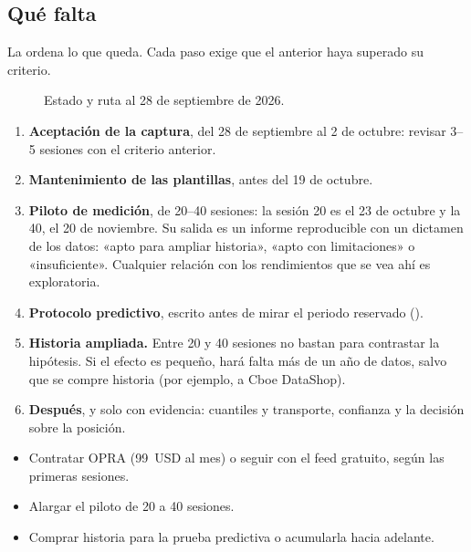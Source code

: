 \subsection{Qué falta}\label{sec:estado_falta}

La  ordena lo que queda. Cada paso exige que el anterior haya superado su criterio.

\begin{figure}[H]
\centering
\resizebox{\linewidth}{!}{}
\caption{Estado y ruta al 28 de septiembre de 2026.}
\label{fig:ruta}
\end{figure}

\begin{enumerate}
\item \textbf{Aceptación de la captura}, del 28 de septiembre al 2 de octubre: revisar 3--5 sesiones con el
criterio anterior.
\item \textbf{Mantenimiento de las plantillas}, antes del 19 de octubre.
\item \textbf{Piloto de medición}, de 20--40 sesiones: la sesión 20 es el 23 de octubre y la 40, el 20 de
noviembre. Su salida es un informe reproducible con un dictamen de los datos: «apto para ampliar historia»,
«apto con limitaciones» o «insuficiente». Cualquier relación con los rendimientos que se vea ahí es
exploratoria.
\item \textbf{Protocolo predictivo}, escrito antes de mirar el periodo reservado
().
\item \textbf{Historia ampliada.} Entre 20 y 40 sesiones no bastan para contrastar la hipótesis. Si el efecto
es pequeño, hará falta más de un año de datos, salvo que se compre historia (por ejemplo, a Cboe DataShop).
\item \textbf{Después}, y solo con evidencia: cuantiles y transporte, confianza y la decisión sobre la
posición.
\end{enumerate}

\begin{pendiente}
\begin{itemize}
\item Contratar OPRA (99~USD al mes) o seguir con el feed gratuito, según las primeras sesiones.
\item Alargar el piloto de 20 a 40 sesiones.
\item Comprar historia para la prueba predictiva o acumularla hacia adelante.
\end{itemize}
\end{pendiente}

